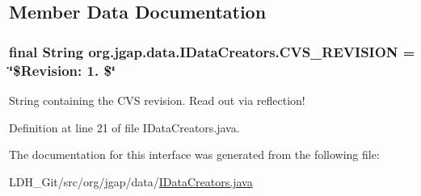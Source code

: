 \subsection{Member Data Documentation}
\hypertarget{interfaceorg_1_1jgap_1_1data_1_1_i_data_creators_a5b395b50943986a46eeb3b0b09c31aad}{
\subsubsection[{C\-V\-S\-\_\-\-R\-E\-V\-I\-S\-I\-O\-N}]{\setlength{\rightskip}{0pt plus 5cm}final String org.\-jgap.\-data.\-I\-Data\-Creators.\-C\-V\-S\-\_\-\-R\-E\-V\-I\-S\-I\-O\-N = \char`\"{}\$Revision\-: 1. \$\char`\"{}\hspace{0.3cm}{\ttfamily [static]}}}\label{interfaceorg_1_1jgap_1_1data_1_1_i_data_creators_a5b395b50943986a46eeb3b0b09c31aad}
String containing the C\-V\-S revision. Read out via reflection! 

Definition at line 21 of file I\-Data\-Creators.\-java.



The documentation for this interface was generated from the following file\-:\begin{DoxyCompactItemize}
\item 
L\-D\-H\-\_\-\-Git/src/org/jgap/data/\hyperlink{_i_data_creators_8java}{I\-Data\-Creators.\-java}\end{DoxyCompactItemize}
